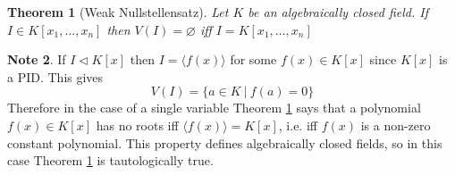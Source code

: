 \documentclass[12pt, letterpaper, oneside]{article}
\theoremstyle{plain}
\newtheorem{theorem}{Theorem}[section]
\theoremstyle{definition}
\newtheorem{note}[theorem]{Note}
\newcommand{\subgp}[1]{\langle#1\rangle}
\newcommand{\vs}{\vskip 5mm}
\begin{document}
\vs\vs

\begin{theorem}[Weak Nullstellensatz]
\label{THM_WEAKNULLSTELL}
Let $K$ be an algebraically closed field. If  $I\in K[x_{1}, \dots, x_{n}]$ then 
$V(I) = \varnothing$ iff $I = K[x_{1}, \dots , x_{n} ] $
\end{theorem}



\vs\vs

\begin{note}
If  $I\lhd K[x]$ then $I = \subgp{f(x)}$ 
for some $f(x)\in K[x]$ since $K[x]$ is a PID. This gives 
$$V(I) = \{ a\in K \ | \ f(a) = 0 \}$$
Therefore in the case of a single variable Theorem \ref{THM_WEAKNULLSTELL}
says that a polynomial $f(x) \in K[x]$ has no roots iff $\subgp{f(x)} = K[x]$, 
i.e. iff  $f(x)$ is a non-zero constant polynomial. This property defines algebraically 
closed fields, so in this case Theorem \ref{THM_WEAKNULLSTELL} is tautologically true.
\end{note}



\vs\vs
\end{document}
